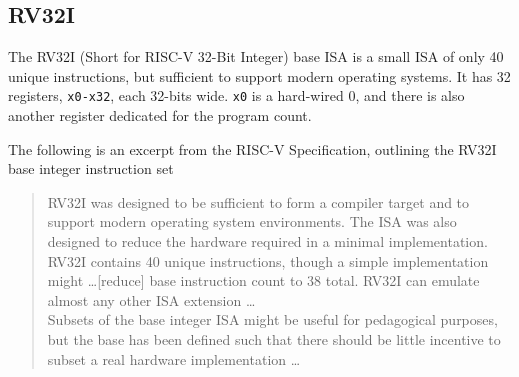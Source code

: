 \subsection{RV32I}
    The RV32I (Short for RISC-V 32-Bit Integer) base \gls{ISA} is a small \gls{ISA} of only 40 unique instructions, but sufficient to support modern operating systems. It has 32 registers, \texttt{x0-x32}, each 32-bits wide. \texttt{x0} is a hard-wired 0, and there is also another register dedicated for the program count. 


    The following is an excerpt from the RISC-V Specification, outlining the RV32I base integer instruction set \cite{Waterman2019}
    \begin{quote}{}
        \small{RV32I was designed to be sufficient to form a compiler target and to support modern operating system environments. The ISA was also designed to reduce the hardware required in a minimal implementation. RV32I contains 40 unique instructions, though a simple implementation might \dots [reduce] base instruction count to 38 total. RV32I can emulate almost any other ISA extension \dots \\
        Subsets of the base integer ISA might be useful for pedagogical purposes, but the base has been defined such that there should be little incentive to subset a real hardware implementation \dots}
    \end{quote}



